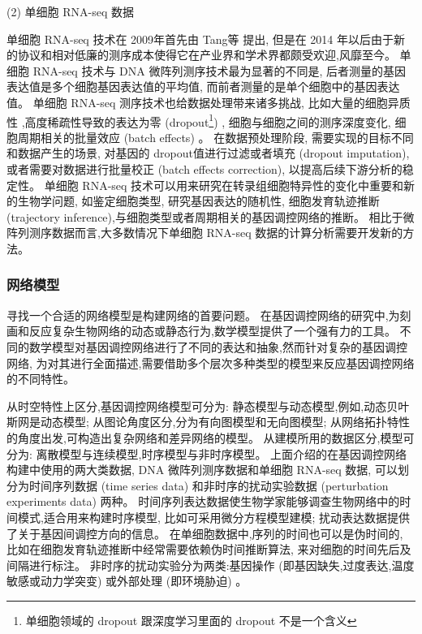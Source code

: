 (2) 单细胞 RNA-seq 数据

单细胞 RNA-seq 技术在 2009年首先由 Tang等 \cite{tang2009mrna}提出,
但是在 2014 年以后由于新的协议和相对低廉的测序成本使得它在产业界和学术界都颇受欢迎,风靡至今。
单细胞 RNA-seq 技术与 DNA 微阵列测序技术最为显著的不同是,
后者测量的基因表达值是多个细胞基因表达值的平均值,
而前者测量的是单个细胞中的基因表达值。
单细胞 RNA-seq 测序技术也给数据处理带来诸多挑战,
比如大量的细胞异质性 \cite{wagner2016revealing},高度稀疏性导致的表达为零 (dropout\footnote{单细胞领域的 dropout 跟深度学习里面的 dropout 不是一个含义}) \cite{vallejos2017normalizing}, 细胞与细胞之间的测序深度变化, 细胞周期相关的批量效应 (batch effects) \cite{buettner2015computational}。
在数据预处理阶段, 需要实现的目标不同和数据产生的场景, 对基因的 dropout值进行过滤或者填充 (dropout imputation), 或者需要对数据进行批量校正 (batch effects correction), 以提高后续下游分析的稳定性。
单细胞 RNA-seq 技术可以用来研究在转录组细胞特异性的变化中重要和新的生物学问题,
如鉴定细胞类型, 研究基因表达的随机性, 细胞发育轨迹推断 (trajectory inference),与细胞类型或者周期相关的基因调控网络的推断。
相比于微阵列测序数据而言,大多数情况下单细胞 RNA-seq 数据的计算分析需要开发新的方法。

\subsubsection{网络模型}

寻找一个合适的网络模型是构建网络的首要问题。
在基因调控网络的研究中,为刻画和反应复杂生物网络的动态或静态行为,数学模型提供了一个强有力的工具。
不同的数学模型对基因调控网络进行了不同的表达和抽象,然而针对复杂的基因调控网络,
为对其进行全面描述,需要借助多个层次多种类型的模型来反应基因调控网络的不同特性。

从时空特性上区分,基因调控网络模型可分为:
静态模型与动态模型,例如,动态贝叶斯网是动态模型;
从图论角度区分,分为有向图模型和无向图模型;
从网络拓扑特性的角度出发,可构造出复杂网络和差异网络的模型。 
从建模所用的数据区分,模型可分为:
离散模型与连续模型,时序模型与非时序模型。
上面介绍的在基因调控网络构建中使用的两大类数据, DNA 微阵列测序数据和单细胞 RNA-seq 数据, 
可以划分为时间序列数据 (time series data) 和非时序的扰动实验数据 (perturbation experiments data) 两种。
时间序列表达数据使生物学家能够调查生物网络中的时间模式,适合用来构建时序模型, 比如可采用微分方程模型建模; 
扰动表达数据提供了关于基因间调控方向的信息。
在单细胞数据中,序列的时间也可以是伪时间的, 比如在细胞发育轨迹推断中经常需要依赖伪时间推断算法, 来对细胞的时间先后及间隔进行标注。
非时序的扰动实验分为两类:基因操作 (即基因缺失,过度表达,温度敏感或动力学突变) \cite{holstege1998dissecting} 或外部处理 (即环境胁迫) \cite{gasch2000genomic}。


